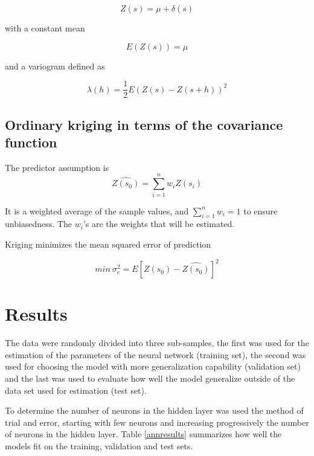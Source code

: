 \documentclass[11pt,twoside]{rmta2010esp}%
\begin{document}
\begin{equation}
Z(s) = \mu + \delta(s)
\end{equation}

with a constant mean 

\begin{equation}
E\left(Z(s)\right) = \mu
\end{equation}

and a variogram defined as 

\begin{equation}
\lambda(h) = \frac{1}{2}E\left(Z(s) - Z(s+h)\right)^{2}
\end{equation}


\subsection*{Ordinary kriging in terms of the covariance function}
The predictor assumption is 
\begin{equation}
\hat{Z(s_{0})} = \sum_{i=1}^{n} w_{i}Z(s_{i})
\end{equation}

It is a weighted average of the sample values, and $ \sum_{i=1}^{n} w_{i} = 1 $ to ensure unbiasedness. The $w_{i}$'s are the weights that will be estimated. 
  
Kriging minimizes the mean squared error of prediction 

\begin{equation}
min \ \sigma_{e}^{2} = E\left[Z(s_{0}) - \hat{Z(s_{0})}\right]^{2}
\end{equation}  


\section{Results}
The data were randomly divided into three sub-samples, the first was used for the
estimation of the parameters of the neural network (training set), the second was used for
choosing the model with more generalization capability (validation set) and the last was
used to evaluate how well the model generalize outside of the data set used for estimation (test set). 

To determine the number of neurons in the hidden layer was used the method of trial and error, starting with few neurons and increasing progressively the number of neurons in the hidden layer. Table \ref{annresults}
summarizes how well the models fit on the training, validation and test sets.
\end{document}
